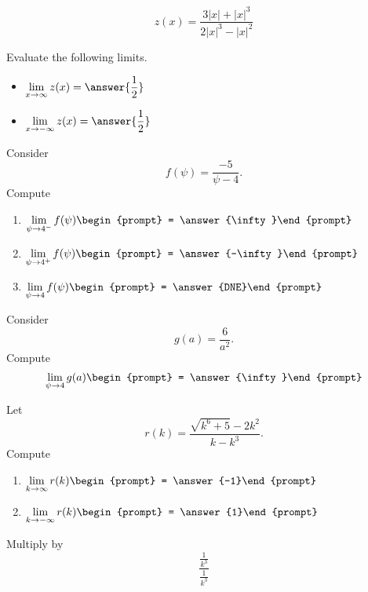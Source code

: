 \documentclass[handout]{ximera}
\begin{document}
\begin{exercise}
\[
z(x) = \frac{3|x|+|x|^3}{2|x|^3 - |x|^2}
\]

Evaluate the following limits.  

\begin{itemize}

\item $\displaystyle\lim_{x \to \infty} z(x) = \answer{\frac{1}{2}}$

\item $\displaystyle\lim_{x \to -\infty} z(x) = \answer{\frac{1}{2}}$

\end{itemize}

\end{exercise}

\begin{exercise}
Consider 
\[
f(\psi) = \frac{-5}{\psi -4}.
\]
Compute
\begin{enumerate}
\item $\displaystyle\lim_{\psi\to 4^- } f(\psi) \begin{prompt} = \answer{\infty}\end{prompt}$
\item $\displaystyle\lim_{\psi\to 4^+ } f(\psi) \begin{prompt} = \answer{-\infty}\end{prompt}$
\item $\displaystyle\lim_{\psi\to 4 } f(\psi) \begin{prompt} = \answer{DNE}\end{prompt}$
\end{enumerate}
\end{exercise}

\begin{exercise}
Consider 
\[
g(a) = \frac{6}{a^2}.
\]
Compute
\[ \displaystyle\lim_{\psi\to 4 } g(a) \begin{prompt} = \answer{\infty}\end{prompt} \]

\end{exercise}

\begin{exercise}
Let 
\[
r(k) = \frac{\sqrt{k^6+5}-2 k^2}{k-k^3}.
\]
Compute
\begin{enumerate}
\item $\displaystyle\lim_{k\to \infty} r(k) \begin{prompt} = \answer{-1}\end{prompt}$
\item $\displaystyle\lim_{k\to -\infty}r(k) \begin{prompt} = \answer{1}\end{prompt}$
\end{enumerate}
\begin{hint}
Multiply by
\[
\frac{\frac{1}{k^3}}{\frac{1}{k^3}}
\]
\end{hint}
\end{exercise}
\end{document}
